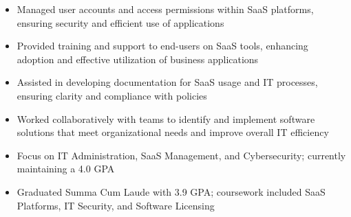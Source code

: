 \par\smallskip
\noindent
\begin{minipage}{20cm}
  \begin{minipage}{9.75cm}
    \begin{itemize}
      \item Managed user accounts and access permissions within SaaS platforms, ensuring security and efficient use of applications
      \item Provided training and support to end-users on SaaS tools, enhancing adoption and effective utilization of business applications
    \end{itemize}
  \end{minipage}
  \hfill
  \begin{minipage}{9.75cm}
    \begin{itemize}
      \item Assisted in developing documentation for SaaS usage and IT processes, ensuring clarity and compliance with policies
      \item Worked collaboratively with teams to identify and implement software solutions that meet organizational needs and improve overall IT efficiency
    \end{itemize}
  \end{minipage}
\end{minipage}

\begin{itemize}
  \item Focus on IT Administration, SaaS Management, and Cybersecurity; currently maintaining a 4.0 GPA
\end{itemize}
\divider

\begin{itemize}
  \item Graduated Summa Cum Laude with 3.9 GPA; coursework included SaaS Platforms, IT Security, and Software Licensing
\end{itemize}

\noindent
\begin{minipage}{20cm}
     
     
    
\end{minipage}


